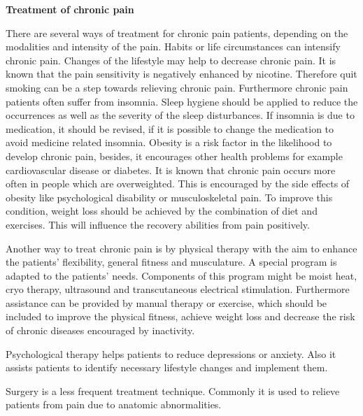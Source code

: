 \textbf{Treatment of chronic pain}

There are several ways of treatment for chronic pain patients, depending on the modalities and intensity of the pain.
Habits or life circumstances can intensify chronic pain. Changes of the lifestyle may help to decrease chronic pain. It is known that the pain sensitivity is negatively enhanced by nicotine. Therefore quit smoking can be a step towards relieving chronic pain.
Furthermore chronic pain patients often suffer from insomnia. Sleep hygiene should be applied to reduce the occurrences as well as the severity of the sleep disturbances. If insomnia is due to medication, it should be revised, if it is possible to change the medication to avoid medicine related insomnia.
Obesity is a risk factor in the likelihood to  develop chronic pain, besides, it encourages other health problems for example cardiovascular disease or diabetes. It is known that chronic pain occurs more often in people which are overweighted. This is encouraged by the side effects of obesity like psychological disability or musculoskeletal pain. To improve this condition, weight loss should be achieved by the combination of diet and exercises. This will influence the recovery abilities from pain positively.

Another way to treat chronic pain is by physical therapy with the aim to enhance the patients' flexibility, general fitness and musculature. A special program is adapted to the patients' needs. Components of this program might be moist heat, cryo therapy, ultrasound and transcutaneous electrical stimulation. Furthermore assistance can be provided by manual therapy or exercise, which should be included to improve the physical fitness, achieve weight loss and decrease the risk of chronic diseases encouraged by inactivity.

Psychological therapy helps patients to reduce depressions or anxiety. Also it assists patients to identify necessary lifestyle changes and implement them.

Surgery is a less frequent treatment technique. Commonly it is used to relieve patients from pain due to anatomic abnormalities.

